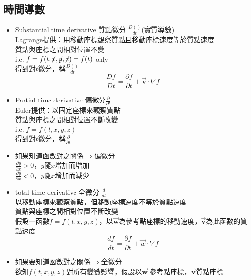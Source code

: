 \documentclass[../main.tex]{subfiles}
\begin{document}
\subsection{時間導數}
\begin{itemize}
  \item Substantial time derivative 質點微分 $\frac{D()}{dt}$(實質導數)\\
    Lagrange提供：用移動座標觀察質點且移動座標速度等於質點速度\\
    質點與座標之間相對位置不變\\
    i.e. $f=f(t,\cancel{x},\cancel{y},\cancel{z})=f(t)$ only\\
    得到對$t$微分，稱$\frac{D()}{dt}$
    \begin{equation}
      \frac{Df}{Dt} = \frac{\partial f}{\partial t} + \vec {\bm v} \cdot \nabla f \label{eq:substantial_time_derivative}
    \end{equation}
  \item Partial time derivative 偏微分$\frac{\partial}{\partial t}$\\
    Euler提供：以固定座標來觀察質點\\
    質點與座標之間相對位置不斷改變\\
    i.e. $f=f(t,x,y,z)$\\
    得到對$t$微分，稱$\frac{\partial}{\partial t}$
  \item 如果知道函數對之關係$\Rightarrow$偏微分\\
      $\frac{\partial y}{\partial x}>0$，$y$隨$x$增加而增加\\
      $\frac{\partial y}{\partial x}<0$，$y$隨$x$增加而減少
  \item total time derivative 全微分 $\frac{d}{dt}$\\
    以移動座標來觀察質點，但移動座標速度不等於質點速度\\
    質點與座標之間相對位置不斷改變\\
    假設一函數$f=f(t,x,y,z)$，以$\vec {\bm w}$為參考點座標的移動速度，$\vec {\bm v}$為此函數的質點速度
    \begin{equation}
      \boxed{\frac{df}{dt} =\frac{\partial f}{\partial t}+ \vec{w}\cdot \nabla f} \label{eq:total_time_derivative}
    \end{equation}
  \item 如果要知道函數對之關係$\Rightarrow$全微分\\
    欲知$f(t,x,y,z)$對所有變數影響，假設以$\vec {\bm w}$ 參考點座標，$\vec {\bm v}$質點座標\\

\end{itemize}
\end{document}
